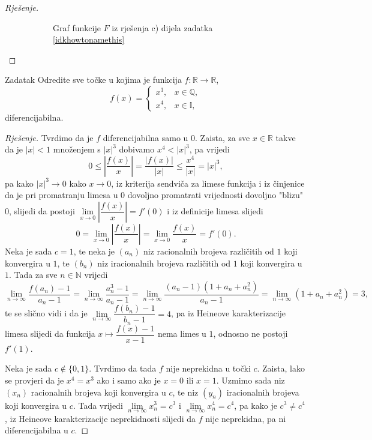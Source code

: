 \begin{proof}[Rješenje]
\begin{figure}[ht]
\begin{subfigure}[t]{.5\textwidth}
\caption*{Graf funkcije \(F\) iz rješenja c) dijela zadatka \ref{idkhowtonamethis}}
\end{subfigure}
\caption{\label{dergraph}}
\end{figure}
\end{proof}
\newpage
\begin{exercise}{Zadatak}
Odredite sve točke u kojima je funkcija \(f : \mathbb{R}\to \mathbb{R}\),
\[f(x)=\begin{cases}
x^3,& x\in \mathbb{Q},\\
x^4,& x\in \mathbb{I},
\end{cases}\]
diferencijabilna.
\end{exercise}
\begin{proof}[Rješenje]
Tvrdimo da je \(f\) diferencijabilna samo u \(0\). Zaista, za sve \(x\in \mathbb{R}\) takve da je \(|x|<1\) množenjem s \(|x|^3\) dobivamo \(x^4<|x|^3\), pa vrijedi
\[0\leq \left\lvert\dfrac{f(x)}{x}\right\rvert=\dfrac{|f(x)|}{|x|}\leq \dfrac{x^4}{|x|}=|x|^3,\]
pa kako \(|x|^3\to 0\) kako \(x\to 0\), iz kriterija sendviča za limese funkcija i iz činjenice da je pri promatranju limesa u \(0\) dovoljno promatrati vrijednosti dovoljno "blizu" \(0\), slijedi da postoji \(\lim\limits_{x\to 0}{\left\lvert\dfrac{f(x)}{x}\right\rvert}=f'(0)\) i iz definicije limesa slijedi
\[0=\lim\limits_{x\to 0}{\left\lvert\dfrac{f(x)}{x}\right\rvert}=\lim\limits_{x\to 0}{\dfrac{f(x)}{x}}=f'(0).\]
Neka je sada \(c=1\), te neka je \((a_n)\) niz racionalnih brojeva različitih od \(1\) koji konvergira u \(1\), te \((b_n)\) niz iracionalnih brojeva različitih od \(1\) koji konvergira u \(1\). Tada za sve \(n\in \mathbb{N}\) vrijedi
\[\lim\limits_{n\to \infty}{\dfrac{f(a_n)-1}{a_n-1}}=\lim\limits_{n\to \infty}{\dfrac{a_n^3-1}{a_n-1}}=\lim\limits_{n\to \infty}{\dfrac{(a_n-1)\left(1+a_n+a_n^2\right)}{a_n-1}}=\lim\limits_{n\to \infty}{\left(1+a_n+a_n^2\right)}=3,\]
te se slično vidi i da je \(\lim\limits_{n\to \infty}{\dfrac{f(b_n)-1}{b_n-1}}=4\), pa iz Heineove karakterizacije limesa slijedi da funkcija \(x\mapsto \dfrac{f(x)-1}{x-1}\) nema limes u \(1\), odnosno ne postoji \(f'(1)\).

Neka je sada \(c\notin \{0, 1\}\). Tvrdimo da tada \(f\) nije neprekidna u točki \(c\). Zaista, lako se provjeri da je \(x^4=x^3\) ako i samo ako je \(x=0\) ili \(x=1\). Uzmimo sada niz \((x_n)\) racionalnih brojeva koji konvergira u \(c\), te niz \((y_n)\) iracionalnih brojeva koji konvergira u \(c\). Tada vrijedi \(\lim\limits_{n\to \infty}{x_n^3}=c^3\) i \(\lim\limits_{n\to \infty}{x_n^4}=c^4\), pa kako je \(c^3\neq c^4\), iz Heineove karakterizacije neprekidnosti slijedi da \(f\) nije neprekidna, pa ni diferencijabilna u \(c\).
\end{proof}
